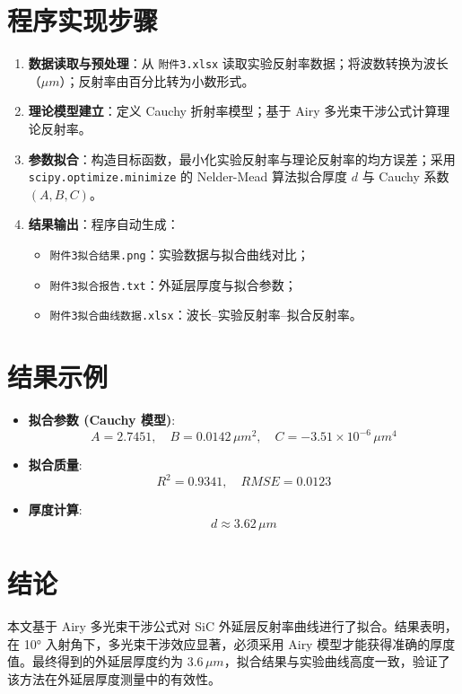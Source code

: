 \documentclass[12pt,a4paper]{article}
\begin{document}
\section{程序实现步骤}
\begin{enumerate}
    \item \textbf{数据读取与预处理}：从 \texttt{附件3.xlsx} 读取实验反射率数据；将波数转换为波长（$\mu m$）；反射率由百分比转为小数形式。
    \item \textbf{理论模型建立}：定义 Cauchy 折射率模型；基于 Airy 多光束干涉公式计算理论反射率。
    \item \textbf{参数拟合}：构造目标函数，最小化实验反射率与理论反射率的均方误差；采用 \texttt{scipy.optimize.minimize} 的 Nelder-Mead 算法拟合厚度 $d$ 与 Cauchy 系数 $(A,B,C)$。
    \item \textbf{结果输出}：程序自动生成：
    \begin{itemize}
        \item \texttt{附件3拟合结果.png}：实验数据与拟合曲线对比；
        \item \texttt{附件3拟合报告.txt}：外延层厚度与拟合参数；
        \item \texttt{附件3拟合曲线数据.xlsx}：波长–实验反射率–拟合反射率。
    \end{itemize}
\end{enumerate}

\section{结果示例}
\begin{itemize}
    \item \textbf{拟合参数 (Cauchy 模型)}: 
    \[
    A = 2.7451, \quad B = 0.0142 \,\mu m^2, \quad C = -3.51\times 10^{-6}\,\mu m^4
    \]
    \item \textbf{拟合质量}: 
    \[
    R^2 = 0.9341, \quad RMSE = 0.0123
    \]
    \item \textbf{厚度计算}: 
    \[
    d \approx 3.62 \,\mu m
    \]
\end{itemize}

\section{结论}
本文基于 Airy 多光束干涉公式对 SiC 外延层反射率曲线进行了拟合。结果表明，在 10° 入射角下，多光束干涉效应显著，必须采用 Airy 模型才能获得准确的厚度值。最终得到的外延层厚度约为 $3.6\,\mu m$，拟合结果与实验曲线高度一致，验证了该方法在外延层厚度测量中的有效性。
\end{document}
